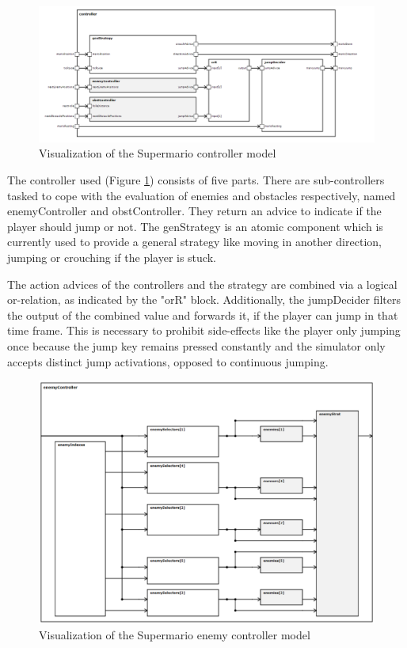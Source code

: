 \begin{figure}
	\centering
	\includegraphics[scale=0.5]{pictures/haller_controller.PNG}
	\caption{Visualization of the Supermario controller model}
	\label{fig:marioController}
\end{figure}

The controller used (Figure \ref{fig:marioController}) consists of five parts. There are sub-controllers tasked to cope with the evaluation of enemies and obstacles respectively, named enemyController and obstController. They return an advice to indicate if the player should jump or not. The genStrategy is an atomic component which is currently used to provide a general strategy like moving in another direction, jumping or crouching if the player is stuck. 

The action advices of the controllers and the strategy are combined via a logical or-relation, as indicated by the "orR" block. Additionally, the jumpDecider filters the output of the combined value and forwards it, if the player can jump in that time frame. This is necessary to prohibit side-effects like the player only jumping once because the jump key remains pressed constantly and the simulator only accepts distinct jump activations, opposed to continuous jumping.

\begin{figure}
	\centering
	\includegraphics[scale=0.4]{pictures/haller_enemycontroller.PNG}
	\caption{Visualization of the Supermario enemy controller model}
	\label{fig:marioEnemyController}
\end{figure}

